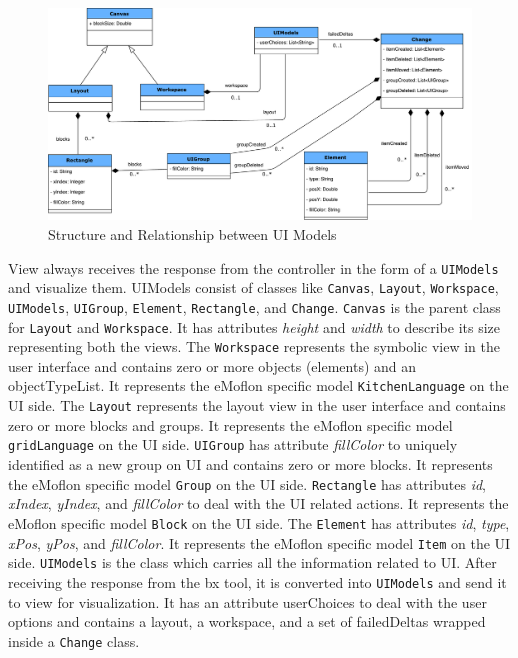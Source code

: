 \begin{figure}
	\includegraphics[width=1\textwidth]{figures/ClassDia_UI-Models}
	\caption{Structure and Relationship between UI Models}
	\label{fig:ClassDia_UI-Models}
\end{figure}

View always receives the response from the controller in the form of a \texttt{UIModels} and visualize them. UIModels consist of classes like \texttt{Canvas}, \texttt{Layout}, \texttt{Workspace}, \texttt{UIModels}, \texttt{UIGroup}, \texttt{Element}, \texttt{Rectangle}, and \texttt{Change}. \texttt{Canvas} is the parent class for \texttt{Layout} and \texttt{Workspace}. It has attributes \textit{height} and \textit{width} to describe its size representing both the views. The \texttt{Workspace} represents the symbolic view in the user interface and contains zero or more objects (elements) and an objectTypeList. It represents the eMoflon specific model \texttt{KitchenLanguage} on the UI side. The \texttt{Layout} represents the layout view in the user interface and contains zero or more blocks and groups. It represents the eMoflon specific model \texttt{gridLanguage} on the UI side.  \texttt{UIGroup} has attribute \textit{fillColor} to uniquely identified as a new group on UI and contains zero or more blocks. It represents the eMoflon specific model \texttt{Group} on the UI side. \texttt{Rectangle} has attributes \textit{id}, \textit{xIndex}, \textit{yIndex}, and \textit{fillColor} to deal with the UI related actions. It represents the eMoflon specific model \texttt{Block} on the UI side. The \texttt{Element} has attributes \textit{id}, \textit{type}, \textit{xPos}, \textit{yPos}, and \textit{fillColor}. It represents the eMoflon specific model \texttt{Item} on the UI side. \texttt{UIModels} is the class which carries all the information related to UI. After receiving the response from the bx tool, it is converted into \texttt{UIModels} and send it to view for visualization. It has an attribute userChoices to deal with the user options and contains a layout, a workspace, and a set of failedDeltas wrapped inside a \texttt{Change} class.

